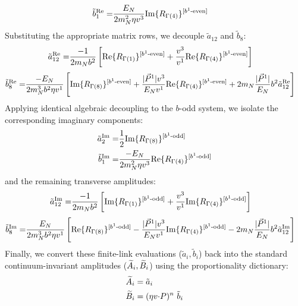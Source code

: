 \begin{widetext}
\begin{align}
    \tilde b^{\text{Re}}_1 = & \frac{E_{N}}{2m_N^2 \eta v^3} \text{Im}\{ R_{\Gamma(4)}\}^{[b^{1}\text{-even}]}
\end{align}
Substituting the appropriate matrix rows, we decouple $\tilde a_{12}$ and $\tilde b_8$:
\begin{align}
   \tilde a^{\text{Re}}_{12}=&\frac{-1}{2m_N  b^2}\left[\text{Re}\{ R_{\Gamma(1)}\}^{[b^{1}\text{-even}]}+\frac{v^3}{v^1}\text{Re}\{ R_{\Gamma(4)}\}^{[b^{1}\text{-even}]}\right]
\end{align}
\begin{align}
    \tilde b^{\text{Re}}_8=&\frac{-E_N}{ 2m_N^3 b^2 \eta v^1 }\left[\text{Im}\{ R_{\Gamma(8)}\}^{[b^{1}\text{-even}]}+\frac{|\vec{P}^1|v^3}{E_N v^1}\text{Re}\{ R_{\Gamma(4)}\}^{[b^{1}\text{-even}]}+ 2m_N  \frac{|\vec{P}^1|}{E_N} b^2  \tilde a^{\text{Re}}_{12}\right]
\end{align}
Applying identical algebraic decoupling to the $b$-odd system, we isolate the corresponding imaginary components:
\begin{align}
    \tilde a^{\text{Im}}_2 = & \frac{1}{2}\text{Im}\{ R_{\Gamma(8)}\}^{[b^{1}\text{-odd}]} \\
    \tilde b^{\text{Im}}_1 = & \frac{-E_{N}}{2m_N^2 \eta v^3} \text{Re}\{ R_{\Gamma(4)}\}^{[b^{1}\text{-odd}]}
\end{align}
and the remaining transverse amplitudes:
\begin{align}
   \tilde a^{\text{Im}}_{12}=&\frac{-1}{2m_N  b^2}\left[\text{Im}\{ R_{\Gamma(1)}\}^{[b^{1}\text{-odd}]}+\frac{v^3}{v^1}\text{Im}\{ R_{\Gamma(4)}\}^{[b^{1}\text{-odd}]}\right]
\end{align}
\begin{align}
    \tilde b^{\text{Im}}_8=&\frac{E_N}{ 2m_N^3 b^2 \eta v^1 }\left[\text{Re}\{ R_{\Gamma(8)}\}^{[b^{1}\text{-odd}]}-\frac{|\vec{P}^1|v^3}{E_N v^1}\text{Im}\{ R_{\Gamma(4)}\}^{[b^{1}\text{-odd}]}- 2m_N  \frac{|\vec{P}^1|}{E_N} b^2  \tilde a^{\text{Im}}_{12}\right]
\end{align}
Finally, we convert these finite-link evaluations ($\tilde a_i, \tilde b_i$) back into the standard continuum-invariant amplitudes ($\widetilde{A}_i, \widetilde{B}_i$) using the proportionality dictionary:
\begin{align}
	\widetilde{A}_i & = \tilde a_i \\
	 \widetilde{B}_i & = (\eta v {\cdot} P)^n\ \tilde b_i
\end{align}
\end{widetext}
